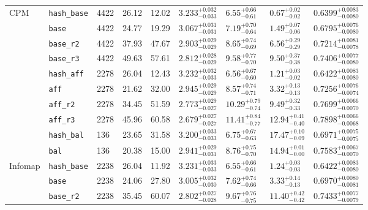 \documentclass[10pt, a4paper, twoside]{article}
\newcommand{\strategy}[1]{\texttt{#1}}
\begin{document}
\begin{minipage}{\textwidth}
\begin{tabular}{|l|l|l|l|l|l|l|l|l|}
CPM & \strategy{hash\_base} & 4422 & 26.12 & 12.02 & $3.233^{+0.032}_{-0.033}$ & $6.55^{+0.66}_{-0.61}$ & $0.67^{+0.02}_{-0.02}$ & $0.6399^{+0.0083}_{-0.0080}$\\
\cline{2-9}
 & \strategy{base} & 4422 & 24.77 & 19.29 & $3.067^{+0.031}_{-0.031}$ & $7.19^{+0.70}_{-0.64}$ & $1.49^{+0.07}_{-0.06}$ & $0.6795^{+0.0076}_{-0.0080}$\\
\cline{2-9}
 & \strategy{base\_r2} & 4422 & 37.93 & 47.67 & $2.903^{+0.029}_{-0.029}$ & $8.65^{+0.74}_{-0.69}$ & $6.56^{+0.29}_{-0.29}$ & $0.7214^{+0.0081}_{-0.0078}$\\
\cline{2-9}
 & \strategy{base\_r3} & 4422 & 49.63 & 57.61 & $2.812^{+0.028}_{-0.029}$ & $9.58^{+0.77}_{-0.70}$ & $9.50^{+0.37}_{-0.38}$ & $0.7406^{+0.0077}_{-0.0080}$\\
\cline{2-9}
 & \strategy{hash\_aff} & 2278 & 26.04 & 12.43 & $3.232^{+0.032}_{-0.033}$ & $6.56^{+0.67}_{-0.60}$ & $1.21^{+0.03}_{-0.02}$ & $0.6422^{+0.0083}_{-0.0080}$\\
\cline{2-9}
 & \strategy{aff} & 2278 & 21.62 & 32.00 & $2.945^{+0.029}_{-0.029}$ & $8.57^{+0.74}_{-0.71}$ & $3.32^{+0.13}_{-0.13}$ & $0.7256^{+0.0076}_{-0.0074}$\\
\cline{2-9}
 & \strategy{aff\_r2} & 2278 & 34.45 & 51.59 & $2.773^{+0.029}_{-0.027}$ & $10.29^{+0.79}_{-0.74}$ & $9.49^{+0.32}_{-0.33}$ & $0.7699^{+0.0066}_{-0.0070}$\\
\cline{2-9}
 & \strategy{aff\_r3} & 2278 & 45.96 & 60.58 & $2.679^{+0.027}_{-0.027}$ & $11.41^{+0.84}_{-0.77}$ & $12.94^{+0.41}_{-0.40}$ & $0.7898^{+0.0066}_{-0.0068}$\\
\cline{2-9}
 & \strategy{hash\_bal} & 136 & 23.65 & 31.58 & $3.200^{+0.033}_{-0.033}$ & $6.75^{+0.67}_{-0.63}$ & $17.47^{+0.10}_{-0.09}$ & $0.6971^{+0.0075}_{-0.0075}$\\
\cline{2-9}
 & \strategy{bal} & 136 & 20.38 & 15.00 & $2.941^{+0.029}_{-0.031}$ & $8.76^{+0.75}_{-0.70}$ & $14.94^{+0.01}_{-0.00}$ & $0.7583^{+0.0067}_{-0.0070}$\\
\hline
Infomap & \strategy{hash\_base} & 2238 & 26.04 & 11.92 & $3.231^{+0.033}_{-0.033}$ & $6.55^{+0.66}_{-0.61}$ & $1.24^{+0.03}_{-0.03}$ & $0.6422^{+0.0083}_{-0.0080}$\\
\cline{2-9}
 & \strategy{base} & 2238 & 24.06 & 27.80 & $3.005^{+0.032}_{-0.030}$ & $7.62^{+0.74}_{-0.66}$ & $3.33^{+0.14}_{-0.13}$ & $0.6970^{+0.0080}_{-0.0081}$\\
\cline{2-9}
 & \strategy{base\_r2} & 2238 & 35.45 & 60.07 & $2.802^{+0.027}_{-0.028}$ & $9.67^{+0.76}_{-0.75}$ & $11.40^{+0.42}_{-0.42}$ & $0.7433^{+0.0077}_{-0.0079}$\\

\end{tabular}
\end{minipage}
\end{document}
